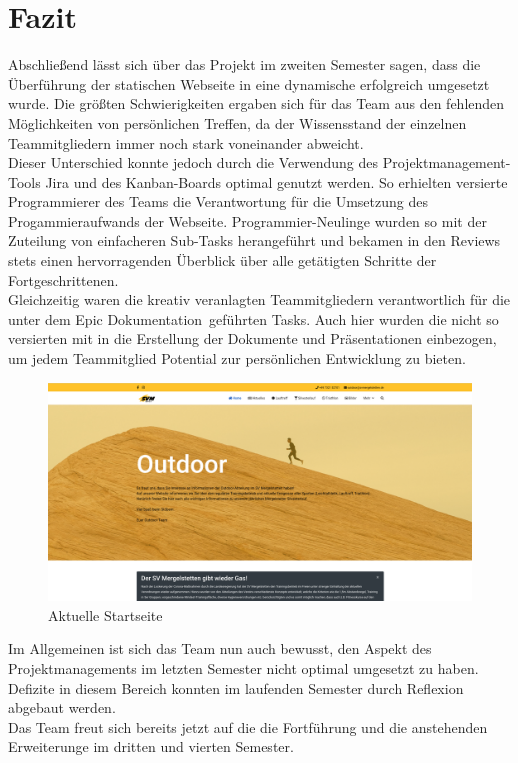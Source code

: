 \documentclass[12pt,a4paper]{article}
\begin{document}
\section{Fazit}
Abschließend lässt sich über das Projekt im zweiten Semester sagen, dass die Überführung der statischen Webseite in eine dynamische erfolgreich umgesetzt wurde. Die größten Schwierigkeiten ergaben sich für das Team aus den fehlenden Möglichkeiten von persönlichen Treffen, da der Wissensstand der einzelnen Teammitgliedern immer noch stark voneinander abweicht. \\
Dieser Unterschied konnte jedoch durch die Verwendung des Projektmanagement-Tools Jira und des Kanban-Boards optimal genutzt werden. So erhielten versierte Programmierer des Teams die Verantwortung für die Umsetzung des Progammieraufwands der Webseite. Programmier-Neulinge wurden so mit der Zuteilung von einfacheren Sub-Tasks herangeführt und bekamen in den Reviews stets einen hervorragenden Überblick über alle getätigten Schritte der Fortgeschrittenen.\\
Gleichzeitig waren die kreativ veranlagten Teammitgliedern verantwortlich für die unter dem Epic \glqq Dokumentation\grqq \ geführten Tasks. Auch hier wurden die nicht so versierten mit in die Erstellung der Dokumente und Präsentationen einbezogen, um  jedem Teammitglied Potential zur persönlichen Entwicklung zu bieten.
\begin{figure}[htbp]
  \includegraphics[width=\textwidth]{Endscreen.png}
  \caption{Aktuelle Startseite}
  \label{img:Startseite}
\end{figure}
\newpage
Im Allgemeinen ist sich das Team nun auch bewusst, den Aspekt des Projektmanagements im letzten Semester nicht optimal umgesetzt zu haben. Defizite in diesem Bereich konnten im laufenden Semester durch Reflexion abgebaut werden.\\
Das Team freut sich bereits jetzt auf die die Fortführung und die anstehenden Erweiterunge im dritten und vierten Semester.
\end{document}
